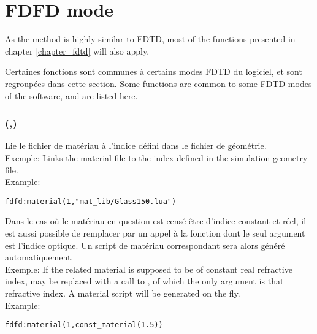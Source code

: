 \section{FDFD mode}


\langswitch
{
	\fwarn
}{
	As the method is highly similar to FDTD, most of the functions presented in chapter \ref{chapter_fdtd} will also apply.
}


\langswitch
{
	Certaines fonctions sont communes à certains modes FDTD du logiciel, et sont regroupées dans cette section.
}{
	Some functions are common to some FDTD modes of the software, and are listed here.
}

\subsubsection[material]{(,)}

\langswitch
{
	Lie le fichier de matériau  à l'indice  défini dans le fichier de géométrie.\\
	Exemple:
}{
	Links the material file  to the index  defined in the simulation geometry file.\\
	Example:
}
\begin{lstlisting}
fdfd:material(1,"mat_lib/Glass150.lua")
\end{lstlisting}

\langswitch
{
	Dans le cas où le matériau en question est censé être d'indice constant et réel, il est aussi possible de remplacer  par un appel à la fonction  dont le seul argument est l'indice optique. Un script de matériau correspondant sera alors généré automatiquement.\\
	Exemple:
}{
	If the related material is supposed to be of constant real refractive index,  may be replaced with a call to , of which the only argument is that refractive index. A material script will be generated on the fly.\\
	Example:
}
\begin{lstlisting}
fdfd:material(1,const_material(1.5))
\end{lstlisting}

